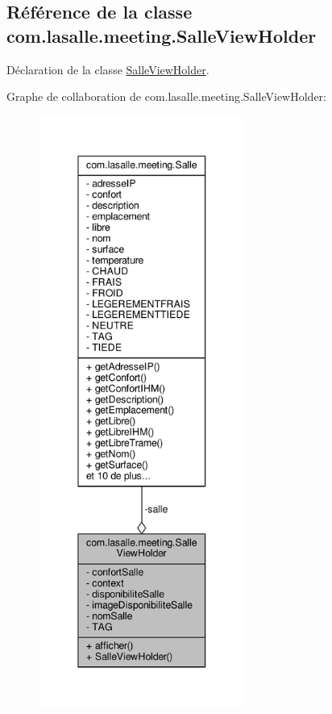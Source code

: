 \hypertarget{classcom_1_1lasalle_1_1meeting_1_1_salle_view_holder}{}\subsection{Référence de la classe com.\+lasalle.\+meeting.\+Salle\+View\+Holder}
\label{classcom_1_1lasalle_1_1meeting_1_1_salle_view_holder}


Déclaration de la classe \hyperlink{classcom_1_1lasalle_1_1meeting_1_1_salle_view_holder}{Salle\+View\+Holder}.  




Graphe de collaboration de com.\+lasalle.\+meeting.\+Salle\+View\+Holder\+:
\nopagebreak
\begin{figure}[H]
\begin{center}
\leavevmode
\includegraphics[height=550pt]{classcom_1_1lasalle_1_1meeting_1_1_salle_view_holder__coll__graph}
\end{center}
\end{figure}
